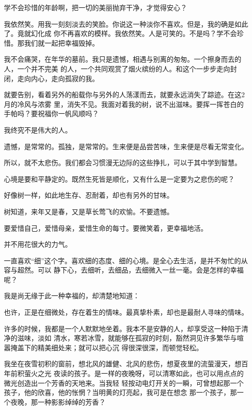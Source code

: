 \documentclass[12pt,a4paper]{article}
\begin{document}
		学不会珍惜的年龄啊，把一切的美丽抛弃干净，才觉得安心？

		我依然笑。用我一刻刻淡去的笑脸。你说这一种淡你不喜欢。但是，我的确是如此了。竟就幻化成
	你不再喜欢的模样。我依然笑。人是可笑的。不是吗？学不会珍惜。那我们就一起把幸福毁掉。

		我不会痛哭，在年华的墓前。我只是遗憾，相遇与别离的匆匆。一个擦身而去的人，一个并不完美
	的人，一个共同观赏了烟火缤纷的人。和这个一步步走向封闭，走向内心，走向孤寂的我。

		就要告别，看着另外的船载你与另外的人荡漾而去，就要永远消失了踪迹。在这2月的冷风与浓雾
	里，消失不见。我面对着我的树，说不出滋味。要挥一挥苍白的手帕吗？要祝福你一帆风顺吗？

		我终究不是伟大的人。

		遗憾，是常常的。孤独，是常常的。生来便是品尝苦味，生来便是尽看无常变化。

		所以，就不太悲伤。我们都会习惯漫无边际的这些挣扎，可以于其中学到智慧。

		心境是要和平静定的。既然生死皆是顺化，又有什么是一定要为之悲伤的呢？

		好像树一样，如此地生存、忍耐着，却也有另外的甘味。

		树知道，来年又是春，又是草长莺飞的欢愉。不要遗憾。

		要爱惜自己，爱惜母亲，爱惜生命的每寸。要微笑着，更幸福地活。

		并不用花很大的力气。

	\endwriting



		一直喜欢“细”这个字。喜欢细的态度、细的心境。是全心去生活，是并不匆忙的从容与超然。可以
	静下心，去细听，去细品，去细微入一丝一毫。会是怎样的幸福呢？

		我是尚无缘于此一种幸福的，却清楚地知道：

		也许，正是在细微处，存在着生的情味。最真挚朴素，却也是最耐人寻味的情味。

		许多的时候，我都是一个人默默地坐着。我本不是安静的人，却享受这一种陷于清净的滋味，淡如
	清水，寒若冰雪，就能够在孤寂的时刻，豁然洞见许多繁华与喧嚣掩盖下的精美细处来；就可以把心沉
	得很深很深，而顿觉轻松。

		我坐在夜雪初积的窗前，想北风的雄健、北风的悲伤，想夏夜里的流萤漫天，想百年前积萤火之光
	夜读的孩子。是一样的夜晚呀，可以清寒如此，也可以用点点的微光创造出一个芳香的天地来。当我轻
	轻按动电灯开关的一瞬，可曾想起那一个孩子，他的欣喜，他的怅惘？当明黄的灯亮起，我可是在想念
	那一个孩子，那一个夜晚，那一种影影绰绰的芳香？
\end{document}

